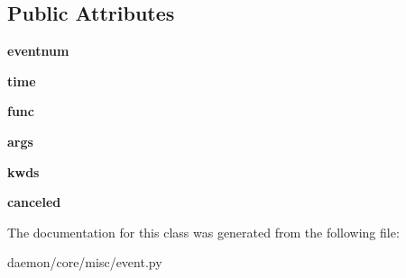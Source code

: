 \subsection*{Public Attributes}
\begin{DoxyCompactItemize}
\item 
\hypertarget{classcore_1_1misc_1_1event_1_1_event_loop_1_1_event_aa1bd485751b0b4210f96c6c6b439d99a}{{\bfseries eventnum}}\label{classcore_1_1misc_1_1event_1_1_event_loop_1_1_event_aa1bd485751b0b4210f96c6c6b439d99a}

\item 
\hypertarget{classcore_1_1misc_1_1event_1_1_event_loop_1_1_event_aaf659e4391e1a39d55d9978092fcbc67}{{\bfseries time}}\label{classcore_1_1misc_1_1event_1_1_event_loop_1_1_event_aaf659e4391e1a39d55d9978092fcbc67}

\item 
\hypertarget{classcore_1_1misc_1_1event_1_1_event_loop_1_1_event_a1b8bad01303d09dd0aeb195d218f61d3}{{\bfseries func}}\label{classcore_1_1misc_1_1event_1_1_event_loop_1_1_event_a1b8bad01303d09dd0aeb195d218f61d3}

\item 
\hypertarget{classcore_1_1misc_1_1event_1_1_event_loop_1_1_event_a555a9e85d62d096e660bb1bfe059ccd8}{{\bfseries args}}\label{classcore_1_1misc_1_1event_1_1_event_loop_1_1_event_a555a9e85d62d096e660bb1bfe059ccd8}

\item 
\hypertarget{classcore_1_1misc_1_1event_1_1_event_loop_1_1_event_ae8ab7fcc84e1fdcf04865753044064da}{{\bfseries kwds}}\label{classcore_1_1misc_1_1event_1_1_event_loop_1_1_event_ae8ab7fcc84e1fdcf04865753044064da}

\item 
\hypertarget{classcore_1_1misc_1_1event_1_1_event_loop_1_1_event_ae50cccb32d18958eff2c6f4530231d7b}{{\bfseries canceled}}\label{classcore_1_1misc_1_1event_1_1_event_loop_1_1_event_ae50cccb32d18958eff2c6f4530231d7b}

\end{DoxyCompactItemize}


The documentation for this class was generated from the following file\+:\begin{DoxyCompactItemize}
\item 
daemon/core/misc/event.\+py\end{DoxyCompactItemize}
